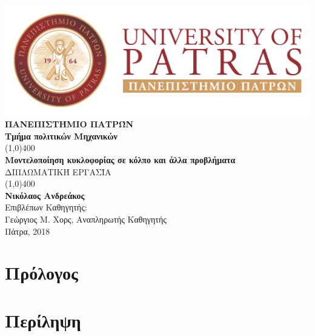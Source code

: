 \documentclass[12pt, a4paper, oneside]{article}
\numberwithin{equation}{subsection}
\newcommand{\theauthor}{Νικόλαος Ανδρεάκος\xspace}
\newcommand{\thetitle}{Μοντελοποίηση κυκλοφορίας σε κόλπο και άλλα προβλήματα\xspace}
\newcommand{\thedate}{Πάτρα, 2018\xspace}
\newcommand{\tmima}{Τμήμα πολιτικών Μηχανικών\xspace}
\newcommand{\proff}{Γεώργιος Μ. Χορς\xspace}
\newcommand{\proffrole}{Αναπληρωτής Καθηγητής\xspace}
\newenvironment{ComputerFont}{\fontfamily{cmr}\selectfont}{\par}
\begin{document}
	\sloppy
	\begin{ComputerFont}
		\begin{titlepage}
			\begin{center}
				\includegraphics[scale=0.4]{logo_pp}\\
				\Large{\MakeUppercase{\textbf{Πανεπιστήμιο Πατρών}}}\\
				\Large{\textbf{\tmima}}\\
				\vfill
				\line(1,0){400}\\[1mm]
				\huge{{\textbf{\thetitle}}}\\[3mm]
				\Large{\MakeUppercase{{Διπλωματική Εργασία}}}\\[1mm]
				\line(1,0){400}\\
				\vfill
				\textbf{\Large{\theauthor}}\\[2mm]
				Επιβλέπων Καθηγητής:\\
				\proff, \proffrole \\
				\vfill
				\thedate \\
			\end{center}
		\end{titlepage}
	\end{ComputerFont}

	\section*{Πρόλογος}
		\thispagestyle{pagenum}
		\lipsum[3-5]
	\cleardoublepage

	\section*{Περίληψη}
		\thispagestyle{pagenum}
		\lipsum[10-12]
	\cleardoublepage

	\tableofcontents
		\thispagestyle{pagenum}
	\clearpage
\end{document}
